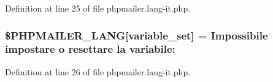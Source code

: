 Definition at line 25 of file phpmailer.\+lang-\/it.\+php.

\subsubsection[{\texorpdfstring{\$\+P\+H\+P\+M\+A\+I\+L\+E\+R\+\_\+\+L\+A\+NG}{$PHPMAILER_LANG}}]{\setlength{\rightskip}{0pt plus 5cm}\$P\+H\+P\+M\+A\+I\+L\+E\+R\+\_\+\+L\+A\+NG\mbox{[}\textquotesingle{}variable\+\_\+set\textquotesingle{}\mbox{]} = \textquotesingle{}Impossibile impostare {\bf o} resettare la variabile\+: \textquotesingle{}}\hypertarget{phpmailer_8lang-it_8php_af795debc7a739d038742691c358d9032}{}\label{phpmailer_8lang-it_8php_af795debc7a739d038742691c358d9032}


Definition at line 26 of file phpmailer.\+lang-\/it.\+php.

